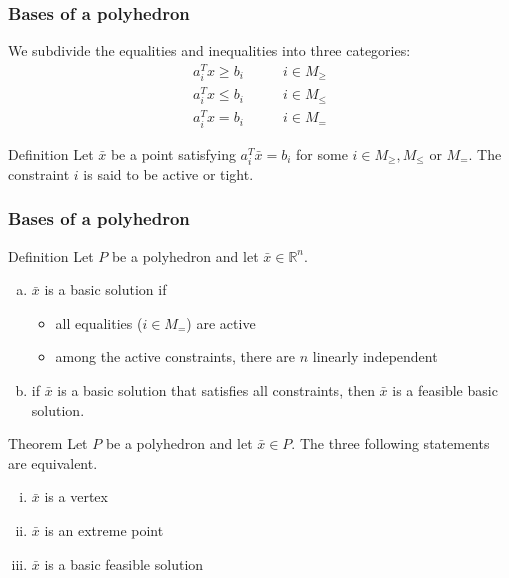 \documentclass[9pt]{beamer}
\newcommand{\R}       {\mathbb{R} }
\begin{document}
\begin{frame}
\frametitle{Bases of a polyhedron}
We subdivide the equalities and inequalities into three categories:
\begin{align*}
a_i^T x \geq b_i \qquad & i\in M_{\geq}\\
a_i^T x \leq b_i \qquad& i \in M_{\leq}\\
a_i^T x = b_i \qquad& i \in M_{=}
\end{align*}
\begin{block}{Definition}
Let  $\bar x$ be a point satisfying  $a_i^T \bar x = b_i$ for some  $i\in M_{\geq}, M_{\leq}$ or
$M_=$. The constraint $i$ is said to be \alert{active} or \alert{tight}.
\end{block}
\end{frame}
\begin{frame}
\frametitle{Bases of a polyhedron}
\begin{block}{Definition}
Let  $P$ be a polyhedron and let $\bar x \in \R^n.$
\begin{enumerate}[(a)]
\item<1-> $\bar x$ is a \alert{basic solution} if 
\begin{itemize}
\item<1-> all equalities ($i\in M_=$) are \alert{active}
\item<1-> among the active constraints, there are \alert{$n$ linearly 
independent} 
\end{itemize}
\item<1-> if $\bar x$ is a basic solution  \alert{that satisfies all constraints}, then
$\bar x$ is a \alert{feasible basic solution}.
\end{enumerate}
\end{block}
\begin{block}{Theorem}
Let  $P$ be a polyhedron and let  $\bar x \in P$. The three following statements are
equivalent.
\begin{enumerate}[(i)]
\item<2-> $\bar x$ is a \alert{vertex}
\item<2-> $\bar x$ is an \alert{extreme point}
\item<2-> $\bar x$ is a \alert{basic feasible solution}
\end{enumerate}
\end{block}
\end{frame}
\end{document}

